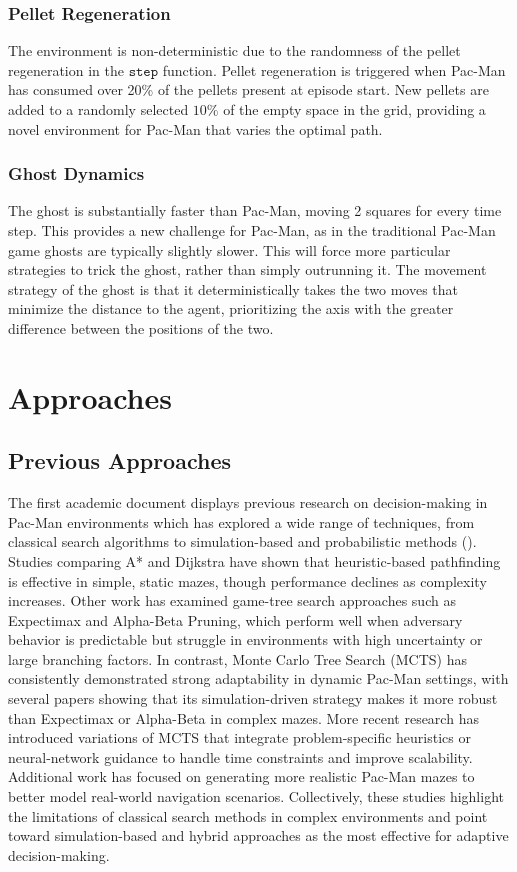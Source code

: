 \documentclass{article}
\begin{document}
\subsubsection{Pellet Regeneration}
The environment is non-deterministic due to the randomness of the pellet regeneration in the $\texttt{step}$ function. Pellet regeneration is triggered when Pac-Man has consumed over 20\% of the pellets present at episode start. New pellets are added to a randomly selected $10\%$ of the empty space in the grid, providing a novel environment for Pac-Man that varies the optimal path. 

\subsubsection{Ghost Dynamics}
The ghost is substantially faster than Pac-Man, moving 2 squares for every time step. This provides a new challenge for Pac-Man, as in the traditional Pac-Man game ghosts are typically slightly slower. This will force more particular strategies to trick the ghost, rather than simply outrunning it. The movement strategy of the ghost is that it deterministically takes the two moves that minimize the distance to the agent, prioritizing the axis with the greater difference between the positions of the two. 

\section{Approaches}

\subsection{Previous Approaches}

The first academic document displays previous research on decision-making in Pac-Man environments which has explored a wide range of techniques, from classical search algorithms to simulation-based and probabilistic methods (\citet{novikov}). Studies comparing A* and Dijkstra have shown that heuristic-based pathfinding is effective in simple, static mazes, though performance declines as complexity increases. Other work has examined game-tree search approaches such as Expectimax and Alpha-Beta Pruning, which perform well when adversary behavior is predictable but struggle in environments with high uncertainty or large branching factors. In contrast, Monte Carlo Tree Search (MCTS) has consistently demonstrated strong adaptability in dynamic Pac-Man settings, with several papers showing that its simulation-driven strategy makes it more robust than Expectimax or Alpha-Beta in complex mazes. More recent research has introduced variations of MCTS that integrate problem-specific heuristics or neural-network guidance to handle time constraints and improve scalability. Additional work has focused on generating more realistic Pac-Man mazes to better model real-world navigation scenarios. Collectively, these studies highlight the limitations of classical search methods in complex environments and point toward simulation-based and hybrid approaches as the most effective for adaptive decision-making.
\end{document}
